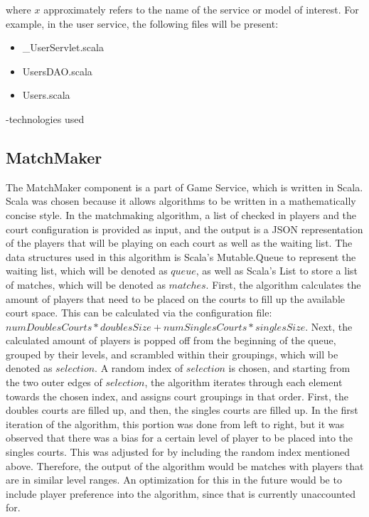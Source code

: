\documentclass{article}
\begin{document}
where $x$ approximately refers to the name of the service or model of interest. For example, in the user service, the following files will be present:

\begin{itemize}
  \item \_UserServlet.scala
  \item UsersDAO.scala
  \item Users.scala
\end{itemize}

-technologies used

\subsection{MatchMaker}
The MatchMaker component is a part of Game Service, which is written in Scala. Scala was chosen because it allows algorithms to be written in a mathematically concise style. In the matchmaking algorithm, a list of checked in players and the court configuration is provided as input, and the output is a JSON representation of the players that will be playing on each court as well as the waiting list. The data structures used in this algorithm is Scala's Mutable.Queue to represent the waiting list, which will be denoted as $queue$, as well as Scala's List to store a list of matches, which will be denoted as $matches$. First, the algorithm calculates the amount of players that need to be placed on the courts to fill up the available court space. This can be calculated via the configuration file: $numDoublesCourts * doublesSize + numSinglesCourts * singlesSize$. Next, the calculated amount of players is popped off from the beginning of the queue, grouped by their levels, and scrambled within their groupings, which will be denoted as $selection$. A random index of $selection$ is chosen, and starting from the two outer edges of $selection$, the algorithm iterates through each element towards the chosen index, and assigns court groupings in that order. First, the doubles courts are filled up, and then, the singles courts are filled up. In the first iteration of the algorithm, this portion was done from left to right, but it was observed that there was a bias for a certain level of player to be placed into the singles courts. This was adjusted for by including the random index mentioned above. Therefore, the output of the algorithm would be matches with players that are in similar level ranges. An optimization for this in the future would be to include player preference into the algorithm, since that is currently unaccounted for.
\end{document}
